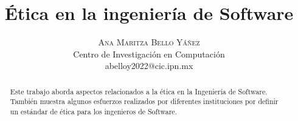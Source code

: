 \documentclass[twoside]{article}
\title{\vspace{-15mm}\fontsize{24pt}{10pt}\selectfont\textbf{Ética en la
ingeniería de Software}}
\author{
\large
\textsc{Ana Maritza Bello Yáñez} \\
\normalsize Centro de Investigación en Computación \\ 
\normalsize {abelloy2022@cic.ipn.mx}
\vspace{-5mm}
}
\date{}
\begin{document}
\maketitle %

\thispagestyle{fancy} %


\begin{abstract}

\noindent Este trabajo aborda aspectos relacionados a la ética en la Ingeniería
de Software. También muestra algunos esfuerzos realizados por diferentes
instituciones por definir un estándar de ética para los ingenieros de Software.

\end{abstract}

\end{document}
